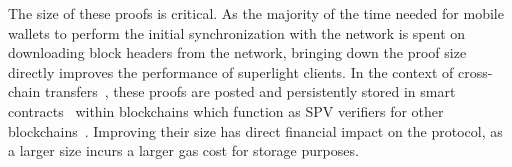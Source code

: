 The size of these proofs is critical. As the majority of the time needed for
mobile wallets to perform the initial synchronization with the network is spent
on downloading block headers from the network, bringing down the proof size
directly improves the performance of superlight clients. In the context of
cross-chain transfers~\cite{pow-sidechains}, these proofs are posted and
persistently stored in smart contracts~\cite{buterin,wood} within blockchains
which function as SPV verifiers for other blockchains~\cite{christoglou}.
Improving their size has direct financial impact
on the protocol, as a larger size incurs a larger gas cost for storage purposes.
